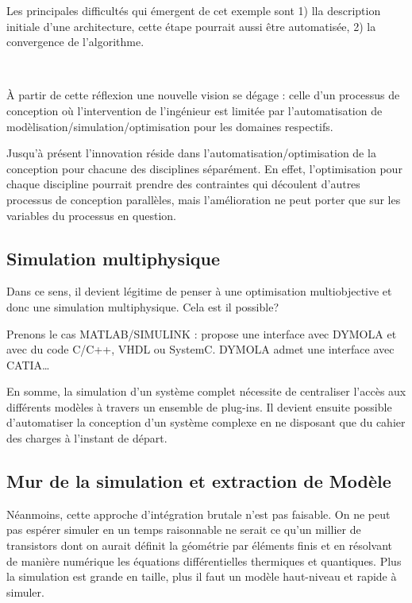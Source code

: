 \documentclass[11pt]{article}
\begin{document}
Les principales difficultés qui émergent de cet  exemple sont 1) lla description initiale d'une architecture, cette étape pourrait aussi être automatisée, 2) la convergence de l'algorithme.

~

\`A partir de cette réflexion une nouvelle vision se dégage : celle d'un processus de conception où l'intervention de l'ingénieur est limitée par l'automatisation de modèlisation/simulation/optimisation pour les domaines respectifs.

Jusqu'à présent l'innovation réside dans l'automatisation/optimisation de la conception pour chacune des disciplines séparément. En effet, l'optimisation pour chaque discipline pourrait prendre des contraintes qui découlent d'autres processus de conception parallèles, mais l'amélioration ne peut porter que sur les variables du processus en question.

\subsection{Simulation multiphysique}

Dans ce sens, il devient légitime de penser à une optimisation multiobjective et  donc une simulation multiphysique. Cela est il possible?

Prenons le cas MATLAB/SIMULINK : propose une interface avec DYMOLA et avec du code C/C++, VHDL ou SystemC. DYMOLA admet une interface avec CATIA\ldots

En somme, la simulation d'un système complet nécessite de centraliser l'accès aux différents modèles à travers un ensemble de plug-ins. Il devient ensuite possible d'automatiser la conception d'un système complexe en ne disposant que du cahier des charges à l'instant de départ.

\subsection{Mur de la simulation et extraction de Modèle}

Néanmoins, cette approche d'intégration brutale n'est pas faisable. On ne peut pas espérer simuler en un temps raisonnable ne serait ce qu'un millier de transistors dont on aurait définit la géométrie par éléments finis et en résolvant de manière numérique les équations différentielles thermiques et quantiques. Plus la simulation est grande en taille, plus il faut un modèle haut-niveau et rapide à simuler.
\end{document}

